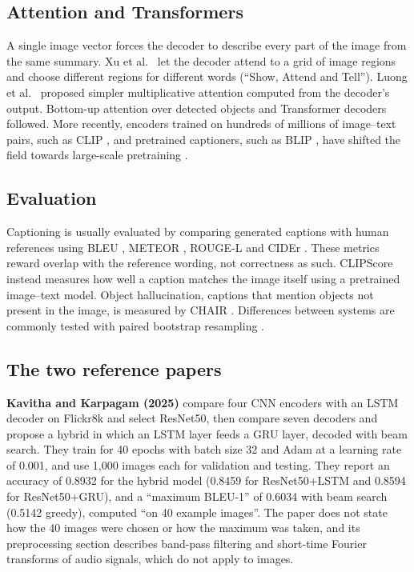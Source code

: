 \documentclass[11pt]{article}
\begin{document}
\subsection{Attention and Transformers}
A single image vector forces the decoder to describe every part of the image from the same summary. Xu et al.\ \cite{xu2015} let the decoder attend to a grid of image regions and choose different regions for different words (``Show, Attend and Tell''). Luong et al.\ \cite{luong2015} proposed simpler multiplicative attention computed from the decoder's output. Bottom-up attention over detected objects \cite{anderson2018} and Transformer decoders \cite{vaswani2017} followed. More recently, encoders trained on hundreds of millions of image--text pairs, such as CLIP \cite{radford2021}, and pretrained captioners, such as BLIP \cite{li2022blip}, have shifted the field towards large-scale pretraining \cite{mokady2021}.

\subsection{Evaluation}
Captioning is usually evaluated by comparing generated captions with human references using BLEU \cite{papineni2002}, METEOR \cite{banerjee2005}, ROUGE-L \cite{lin2004rouge} and CIDEr \cite{vedantam2015}. These metrics reward overlap with the reference wording, not correctness as such. CLIPScore \cite{hessel2021} instead measures how well a caption matches the image itself using a pretrained image--text model. Object hallucination, captions that mention objects not present in the image, is measured by CHAIR \cite{rohrbach2018}. Differences between systems are commonly tested with paired bootstrap resampling \cite{koehn2004,dror2018}.

\subsection{The two reference papers}
\textbf{Kavitha and Karpagam (2025)} \cite{kavitha2025} compare four CNN encoders with an LSTM decoder on Flickr8k and select ResNet50, then compare seven decoders and propose a hybrid in which an LSTM layer feeds a GRU layer, decoded with beam search. They train for 40 epochs with batch size 32 and Adam at a learning rate of 0.001, and use 1,000 images each for validation and testing. They report an accuracy of 0.8932 for the hybrid model (0.8459 for ResNet50+LSTM and 0.8594 for ResNet50+GRU), and a ``maximum BLEU-1'' of 0.6034 with beam search (0.5142 greedy), computed ``on 40 example images''. The paper does not state how the 40 images were chosen or how the maximum was taken, and its preprocessing section describes band-pass filtering and short-time Fourier transforms of audio signals, which do not apply to images.
\end{document}
